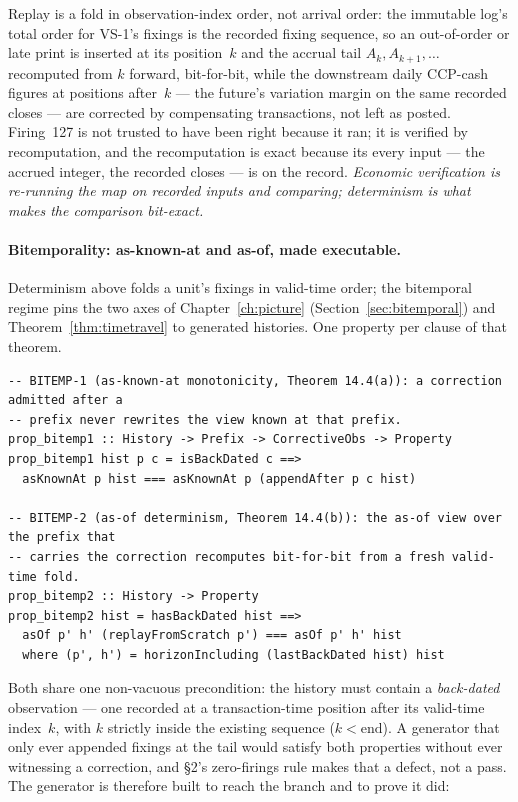 Replay is a fold in observation-index order, not arrival order: the immutable log's total
order for VS-1's fixings is the recorded fixing sequence, so an out-of-order or late print
is inserted at its position~$k$ and the accrual tail $A_{k},A_{k+1},\dots$ recomputed from
$k$ forward, bit-for-bit, while the downstream daily CCP-cash figures at positions after~$k$
--- the future's variation margin on the same recorded closes --- are corrected by
compensating transactions, not left as posted. Firing~127 is not trusted to have been right
because it ran; it is verified by recomputation, and the recomputation is exact because its
every input --- the accrued integer, the recorded closes --- is on the record.
\emph{Economic verification is re-running the map on recorded inputs and comparing;
determinism is what makes the comparison bit-exact.}

\paragraph{Bitemporality: as-known-at and as-of, made executable.}
Determinism above folds a unit's fixings in valid-time order; the bitemporal regime pins the
two axes of Chapter~\ref{ch:picture} (Section~\ref{sec:bitemporal}) and
Theorem~\ref{thm:timetravel} to generated histories. One property per clause of that theorem.

\begin{lstlisting}
-- BITEMP-1 (as-known-at monotonicity, Theorem 14.4(a)): a correction admitted after a
-- prefix never rewrites the view known at that prefix.
prop_bitemp1 :: History -> Prefix -> CorrectiveObs -> Property
prop_bitemp1 hist p c = isBackDated c ==>
  asKnownAt p hist === asKnownAt p (appendAfter p c hist)

-- BITEMP-2 (as-of determinism, Theorem 14.4(b)): the as-of view over the prefix that
-- carries the correction recomputes bit-for-bit from a fresh valid-time fold.
prop_bitemp2 :: History -> Property
prop_bitemp2 hist = hasBackDated hist ==>
  asOf p' h' (replayFromScratch p') === asOf p' h' hist
  where (p', h') = horizonIncluding (lastBackDated hist) hist
\end{lstlisting}

Both share one non-vacuous precondition: the history must contain a \emph{back-dated}
observation --- one recorded at a transaction-time position after its valid-time index~$k$,
with $k$ strictly inside the existing sequence ($k < \text{end}$). A generator that only ever
appended fixings at the tail would satisfy both properties without ever witnessing a
correction, and \S 2's zero-firings rule makes that a defect, not a pass. The generator is
therefore built to reach the branch and to prove it did:

